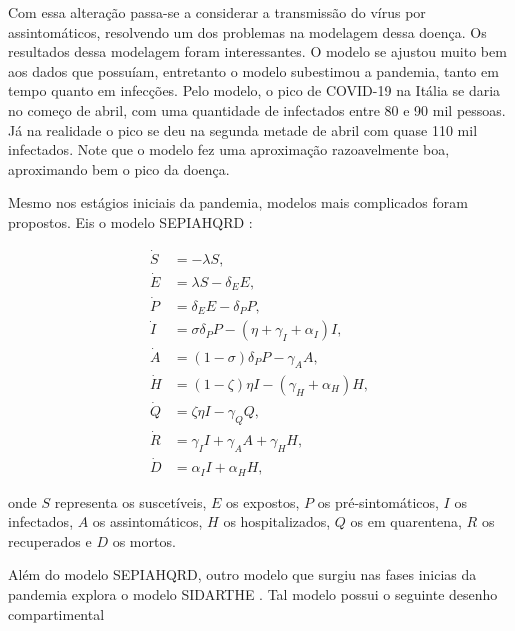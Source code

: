 \documentclass{article}
\begin{document}
Com essa alteração passa-se a considerar a transmissão do vírus por assintomáticos, resolvendo um dos problemas na modelagem dessa doença. Os resultados dessa modelagem foram interessantes. O modelo se ajustou muito bem aos dados que possuíam, entretanto o modelo subestimou a pandemia, tanto em tempo quanto em infecções. Pelo modelo, o pico de COVID-19 na Itália se daria no começo de abril, com uma quantidade de infectados entre 80 e 90 mil pessoas. Já na realidade o pico se deu na segunda metade de abril com quase 110 mil infectados. Note que o modelo fez uma aproximação razoavelmente boa, aproximando bem o pico da doença.

Mesmo nos estágios iniciais da pandemia, modelos mais complicados foram propostos. Eis o modelo SEPIAHQRD \cite{Gatto10484}:

\begin{equation*}
    \begin{split}
        \dot{S} & = -\lambda S,\\
        \dot{E} & = \lambda S - \delta_E E, \\
        \dot{P} & = \delta_E E - \delta_P P, \\
        \dot{I} & = \sigma \delta_P P - (\eta + \gamma_I + \alpha_I) I, \\
        \dot{A} & = (1-\sigma) \delta_P P - \gamma_A A, \\
        \dot{H} & = (1-\zeta) \eta I - (\gamma_H + \alpha_H) H, \\
        \dot{Q} & = \zeta \eta I - \gamma_Q Q, \\
        \dot{R} & = \gamma_I I + \gamma_A A + \gamma_H H, \\
        \dot{D} & = \alpha_I I + \alpha_H H,
    \end{split}
\end{equation*}

\noindent onde $S$ representa os suscetíveis, $E$ os expostos, $P$ os pré-sintomáticos, $I$ os infectados, $A$ os assintomáticos, $H$ os hospitalizados, $Q$ os em quarentena, $R$ os recuperados e $D$ os mortos. 

Além do modelo SEPIAHQRD, outro modelo que surgiu nas fases inicias da pandemia explora o modelo SIDARTHE \cite{JOUR}. Tal modelo possui o seguinte desenho compartimental
\end{document}
